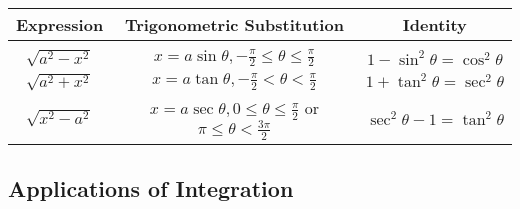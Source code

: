 \begin{center}
\begin{tabular}{c|c|c}
    Expression & Trigonometric Substitution & Identity \\[0.25cm]
    \hline
    & & \\[0.25cm]

    $\sqrt{a^2 - x^2}$ & $x = a \sin{\theta}, -\frac{\pi}{2} \leq \theta \leq \frac{\pi}{2}$ & $1 - \sin^2{\theta} = \cos^2{\theta}$ \\[0.5cm]

    $\sqrt{a^2 + x^2}$ & $x = a \tan{\theta}, -\frac{\pi}{2} < \theta < \frac{\pi}{2}$ & $1 + \tan^2{\theta} = \sec^2{\theta}$ \\[0.5cm]

    $\sqrt{x^2 - a^2}$ & $x = a \sec{\theta}, 0 \leq \theta \leq \frac{\pi}{2}$ or $\pi \leq \theta < \frac{3 \pi}{2}$ & $\sec^2{\theta} - 1 = \tan^2{\theta}$
\end{tabular}
\end{center}

\subsection{Applications of Integration}

